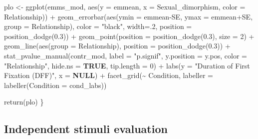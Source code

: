 \documentclass[
  bookmarksnumbered]{article}
\newenvironment{Shaded}{\begin{snugshade}}{\end{snugshade}}
\newcommand{\AttributeTok}[1]{\textcolor[rgb]{0.80,0.80,0.80}{#1}}
\newcommand{\ConstantTok}[1]{\textcolor[rgb]{0.86,0.64,0.64}{\textbf{#1}}}
\newcommand{\DecValTok}[1]{\textcolor[rgb]{0.86,0.86,0.80}{#1}}
\newcommand{\FloatTok}[1]{\textcolor[rgb]{0.75,0.75,0.82}{#1}}
\newcommand{\FunctionTok}[1]{\textcolor[rgb]{0.94,0.94,0.56}{#1}}
\newcommand{\NormalTok}[1]{\textcolor[rgb]{0.80,0.80,0.80}{#1}}
\newcommand{\OtherTok}[1]{\textcolor[rgb]{0.94,0.94,0.56}{#1}}
\newcommand{\SpecialCharTok}[1]{\textcolor[rgb]{0.86,0.64,0.64}{#1}}
\newcommand{\StringTok}[1]{\textcolor[rgb]{0.80,0.58,0.58}{#1}}
\begin{document}
\begin{Shaded}
\begin{Highlighting}[]
\NormalTok{  plo }\OtherTok{\textless{}{-}} \FunctionTok{ggplot}\NormalTok{(emms\_mod, }\FunctionTok{aes}\NormalTok{(}\AttributeTok{y =}\NormalTok{ emmean, }\AttributeTok{x =}\NormalTok{ Sexual\_dimorphism, }\AttributeTok{color =}\NormalTok{ Relationship)) }\SpecialCharTok{+}
  \FunctionTok{geom\_errorbar}\NormalTok{(}\FunctionTok{aes}\NormalTok{(}\AttributeTok{ymin =}\NormalTok{ emmean}\SpecialCharTok{{-}}\NormalTok{SE,}
                    \AttributeTok{ymax =}\NormalTok{ emmean}\SpecialCharTok{+}\NormalTok{SE,}
                    \AttributeTok{group =}\NormalTok{ Relationship), }
                \AttributeTok{color =} \StringTok{"black"}\NormalTok{,}
                \AttributeTok{width=}\NormalTok{.}\DecValTok{2}\NormalTok{,}
                \AttributeTok{position =} \FunctionTok{position\_dodge}\NormalTok{(}\FloatTok{0.3}\NormalTok{)) }\SpecialCharTok{+}
  \FunctionTok{geom\_point}\NormalTok{(}\AttributeTok{position =} \FunctionTok{position\_dodge}\NormalTok{(}\FloatTok{0.3}\NormalTok{), }\AttributeTok{size =} \DecValTok{2}\NormalTok{) }\SpecialCharTok{+}
  \FunctionTok{geom\_line}\NormalTok{(}\FunctionTok{aes}\NormalTok{(}\AttributeTok{group =}\NormalTok{ Relationship),}
            \AttributeTok{position =} \FunctionTok{position\_dodge}\NormalTok{(}\FloatTok{0.3}\NormalTok{)) }\SpecialCharTok{+} 
  \FunctionTok{stat\_pvalue\_manual}\NormalTok{(contr\_mod, }
                     \AttributeTok{label =} \StringTok{"p.signif"}\NormalTok{, }
                     \AttributeTok{y.position =}\NormalTok{ y.pos,}
                     \AttributeTok{color =} \StringTok{"Relationship"}\NormalTok{, }\AttributeTok{hide.ns =} \ConstantTok{TRUE}\NormalTok{,}
                     \AttributeTok{tip.length =} \DecValTok{0}\NormalTok{) }\SpecialCharTok{+}
  \FunctionTok{labs}\NormalTok{(}\AttributeTok{y =} \StringTok{"Duration of First Fixation (DFF)"}\NormalTok{,}
       \AttributeTok{x =} \ConstantTok{NULL}\NormalTok{) }\SpecialCharTok{+}
  \FunctionTok{facet\_grid}\NormalTok{(}\SpecialCharTok{\textasciitilde{}}\NormalTok{ Condition,}
             \AttributeTok{labeller =} \FunctionTok{labeller}\NormalTok{(}\AttributeTok{Condition =}\NormalTok{ cond\_labs)) }
  
    \FunctionTok{return}\NormalTok{(plo)}
\NormalTok{\}}
\end{Highlighting}
\end{Shaded}

\subsection{Independent stimuli evaluation}\label{independent-stimuli-evaluation}
\end{document}
